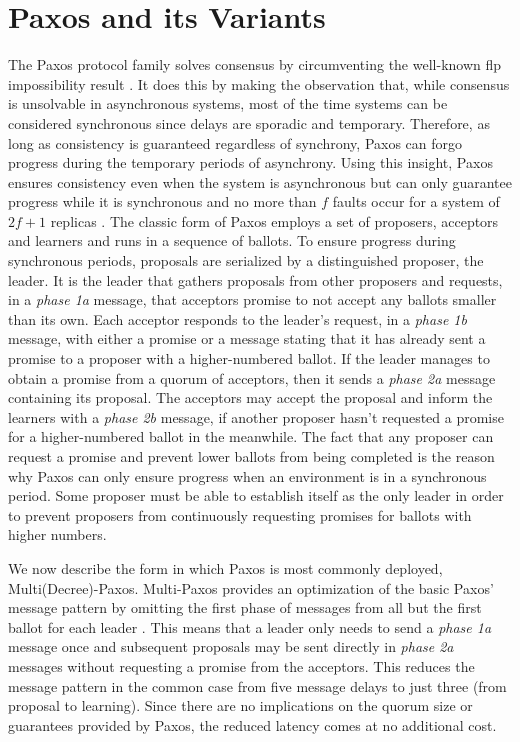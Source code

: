 \section{Paxos and its Variants} \label{Paxos} 
The Paxos protocol family solves consensus by circumventing the well-known \acrshort{flp} impossibility result \cite{Fischer1985}. It does this by making the observation that, while consensus is unsolvable in asynchronous systems, most of the time systems can be considered synchronous since delays are sporadic and temporary. Therefore, as long as consistency is guaranteed regardless of synchrony, Paxos can forgo progress during the temporary periods of asynchrony. Using this insight, Paxos ensures consistency even when the system is asynchronous but can only guarantee progress while it is synchronous and no more than $f$ faults occur for a system of $2f+1$ replicas \cite{Lamport2001}. The classic form of Paxos employs a set of proposers, acceptors and learners and runs in a sequence of ballots. To ensure progress during synchronous periods, proposals are serialized by a distinguished proposer, the leader. It is the leader that gathers proposals from other proposers and requests, in a \textit{phase 1a} message, that acceptors promise to not accept any ballots smaller than its own. Each acceptor responds to the leader's request, in a \textit{phase 1b} message, with either a promise or a message stating that it has already sent a promise to a proposer with a higher-numbered ballot. If the leader manages to obtain a promise from a quorum of acceptors, then it sends a \textit{phase 2a} message containing its proposal. The acceptors may accept the proposal and inform the learners with a \textit{phase 2b} message, if another proposer hasn't requested a promise for a higher-numbered ballot in the meanwhile. The fact that any proposer can request a promise and prevent lower ballots from being completed is the reason why Paxos can only ensure progress when an environment is in a synchronous period. Some proposer must be able to establish itself as the only leader in order to prevent proposers from continuously requesting promises for ballots with higher numbers. \par
We now describe the form in which Paxos is most commonly deployed, Multi(Decree)-Paxos. Multi-Paxos provides an optimization of the basic Paxos' message pattern by omitting the first phase of messages from all but the first ballot for each leader \cite{Renesse2011}. This means that a leader only needs to send a \textit{phase 1a} message once and subsequent proposals may be sent directly in \textit{phase 2a} messages without requesting a promise from the acceptors. This reduces the message pattern in the common case from five message delays to just three (from proposal to learning). Since there are no implications on the quorum size or guarantees provided by Paxos, the reduced latency comes at no additional cost. \par
